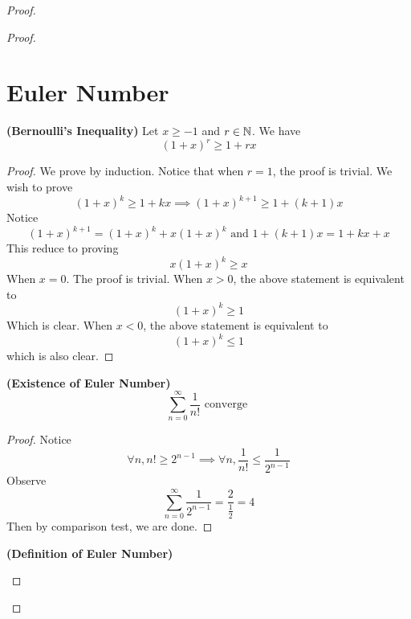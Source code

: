 \documentclass{report}
\begin{document}
\begin{proof}
\begin{proof}
\section{Euler Number}
\begin{lemma}
\label{4.4.1}
\textbf{(Bernoulli's Inequality)} 
Let $x\geq -1$ and $r\in\mathbb{N}$. We have
\begin{equation}
  (1+x)^r\geq 1+rx
\end{equation}
\end{lemma}
\begin{proof}
We prove by induction. Notice that when $r=1$, the proof is trivial. We wish to prove
\begin{equation}
  (1+x)^k \geq 1+kx\implies (1+x)^{k+1}\geq 1+(k+1)x
\end{equation}
Notice
\begin{equation}
  (1+x)^{k+1}=(1+x)^k +x(1+x)^k\text{ and }1+(k+1)x=1+kx+x
\end{equation}
This reduce to proving 
\begin{equation}
x(1+x)^k \geq x
\end{equation}
When $x=0$. The proof is trivial. When  $x>0$, the above statement is equivalent to 
 \begin{equation}
   (1+x)^k\geq 1
\end{equation}
Which is clear. When $x<0$, the above statement is equivalent to 
 \begin{equation}
   (1+x)^k\leq 1
\end{equation}
which is also clear.
\end{proof}
\begin{theorem}
\label{4.4.2}
\textbf{(Existence of Euler Number)} 
\begin{equation}
\sum_{n=0}^\infty \frac{1}{n!}\text{ converge }
\end{equation}
\end{theorem}
\begin{proof}
Notice 
\begin{equation}
\forall n, n!\geq 2^{n-1}\implies \forall n,\frac{1}{n!}\leq \frac{1}{2^{n-1}}
\end{equation}
Observe 
\begin{equation}
\sum_{n=0}^\infty  \frac{1}{2^{n-1}}=\frac{2}{\frac{1}{2}}=4
\end{equation}
Then by comparison test, we are done. 
\end{proof}
\begin{definition}
\label{4.4.3}
\textbf{(Definition of Euler Number)}
\begin{equation}

\end{equation}
\end{definition}
\end{proof}
\end{proof}
\end{document}
